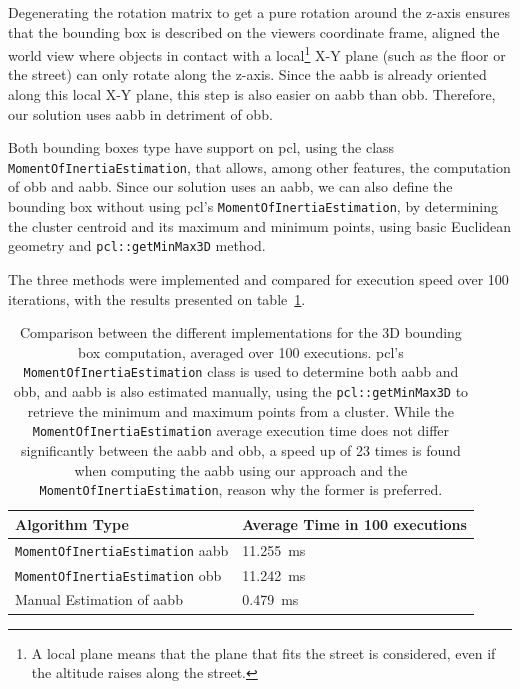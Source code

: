 Degenerating the rotation matrix to get a pure rotation around the z-axis ensures that the bounding box is described on the viewers coordinate frame, aligned the world view where objects in contact with a local\footnote{A local plane means that the plane that fits the street is considered, even if the altitude raises along the street.} X-Y plane (such as the floor or the street) can only rotate along the z-axis. Since the \ac{aabb} is already oriented along this local X-Y plane, this step is also easier on \ac{aabb} than \ac{obb}. Therefore, our solution uses \acf{aabb} in detriment of \ac{obb}.


Both bounding boxes type have support on \ac{pcl}, using the class \texttt{MomentOfInertiaEstimation}, that allows, among other features, the computation of \ac{obb} and \ac{aabb}. Since our solution uses an \ac{aabb}, we can also define the bounding box without using \ac{pcl}'s \texttt{MomentOfInertiaEstimation}, by determining the cluster centroid and its maximum and minimum points, using basic Euclidean geometry and \texttt{pcl::getMinMax3D} method.

The three methods were implemented and compared for execution speed over 100 iterations, with the results presented on table~\ref{tab:bounding-box-estimation-times}.

\begin{table}[H]
	\centering
	\renewcommand{\arraystretch}{1.2}
	\begin{tabular}{@{}p{8cm}l@{}}
		\toprule
		Algorithm Type & Average Time in 100 executions \\
		\midrule
		\texttt{MomentOfInertiaEstimation} \ac{aabb} & \SI{11.255}{\milli\second} \\
		\texttt{MomentOfInertiaEstimation} \ac{obb} & \SI{11.242}{\milli\second} \\
		Manual Estimation of \ac{aabb}& \SI{0.479}{\milli\second} \\
		\bottomrule
	\end{tabular}
	\caption{Comparison between the different implementations for the 3D bounding box computation, averaged over 100 executions. \ac{pcl}'s \texttt{MomentOfInertiaEstimation} class is used to determine both \ac{aabb} and \ac{obb}, and \ac{aabb} is also estimated manually, using the \texttt{pcl::getMinMax3D} to retrieve the minimum and maximum points from a cluster. While the \texttt{MomentOfInertiaEstimation} average execution time does not differ significantly between the \ac{aabb} and \ac{obb}, a speed up of 23 times is found when computing the \ac{aabb} using our approach and the \texttt{MomentOfInertiaEstimation}, reason why the former is preferred.} 
	\label{tab:bounding-box-estimation-times}
\end{table}


